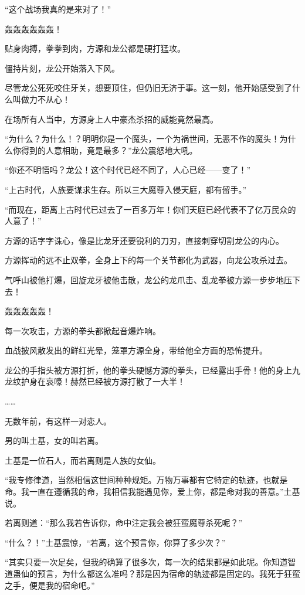 \begin{this_body}
“这个战场我真的是来对了！”

轰轰轰轰轰轰！

贴身肉搏，拳拳到肉，方源和龙公都是硬打猛攻。

僵持片刻，龙公开始落入下风。

尽管龙公死死咬住牙关，想要顶住，但仍旧无济于事。这一刻，他开始感受到了什么叫做力不从心！

在场所有人当中，方源身上人中豪杰杀招的威能竟然最高。

“为什么？为什么！？明明你是一个魔头，一个为祸世间，无恶不作的魔头！为什么你得到的人意相助，竟是最多？”龙公震怒地大吼。

“你还不明悟吗？龙公！这个时代已经不同了，人心已经——变了！”

“上古时代，人族要谋求生存。所以三大魔尊入侵天庭，都有留手。”

“而现在，距离上古时代已过去了一百多万年！你们天庭已经代表不了亿万民众的人意了！”

方源的话字字诛心，像是比龙牙还要锐利的刀刃，直接刺穿切割龙公的内心。

方源挥动的远不止双拳，全身上下的每一个关节都化为武器，向龙公攻杀过去。

气呼山被他打爆，回旋龙牙被他击散，龙公的龙爪击、乱龙拳被方源一步步地压下去！

轰轰轰轰轰！

每一次攻击，方源的拳头都掀起音爆炸响。

血战披风散发出的鲜红光晕，笼罩方源全身，带给他全方面的恐怖提升。

龙公的手指头被方源打折，他的拳头硬憾方源的拳头，已经露出手骨！他的身上九龙纹护身在哀嚎！赫然已经被方源打散了一大半！

……

无数年前，有这样一对恋人。

男的叫土基，女的叫若离。

土基是一位石人，而若离则是人族的女仙。

“我专修律道，当然相信这世间种种规矩。万物万事都有它特定的轨迹，也就是命。我一直在遵循我的命，我相信我能遇见你，爱上你，都是命对我的善意。”土基说。

若离则道：“那么我若告诉你，命中注定我会被狂蛮魔尊杀死呢？”

“什么？！”土基震惊，“若离，这个预言你，你算了多少次？”

“其实只要一次足矣，但我的确算了很多次，每一次的结果都是如此呢。你知道智道蛊仙的预言，为什么都这么准吗？那是因为宿命的轨迹都是固定的。我死于狂蛮之手，便是我的宿命吧。”


\end{this_body}
